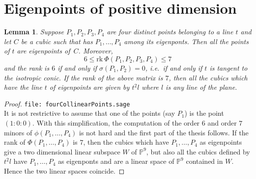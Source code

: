 \documentclass[11pt, a4paper, reqno, captions=tableheading,bibliography=totoc]{scrartcl}
\theoremstyle{plain}
\newtheorem{lemma}{Lemma}[section]
\theoremstyle{definition}
\newcommand{\rk}{\ensuremath{\mathrm{rk}}}
\begin{document}
\section{Eigenpoints of positive dimension}


\begin{lemma}
\label{4ptiSuRetta2}
Suppose $P_1, P_2, P_3, P_4$ are four distinct points belonging to a line $t$
and let
$C$ be a cubic such that has $P_1, \dots, P_4$ among its eigenponts. Then
all the points of $t$ are eigenpoints of~$C$. Moreover,
\begin{equation*}
6 \leq \rk  \  \Phi(P_1, P_2, P_3, P_4) \leq 7
\end{equation*}
and the rank is $6$ if and only if $\sigma(P_1, P_2) = 0$, i.e.\ if
and only if $t$ is tangent to the isotropic conic. If the rank of
the above matrix is $7$, then all the cubics which have the line $t$
of eigenpoints are given by $t^2l$ where $l$ is any line of the plane. 
\end{lemma}
\begin{proof}
\verb+file: fourCollinearPoints.sage+\\
It is not restrictive to assume that one of the points (say $P_1$) is
the point $(1: 0: 0)$. 
With this simplification, the computation of the order $6$ and order $7$
minors of $\phi(P_1, \dots, P_4)$ is not hard and 
the first part of the thesis follows. If the rank of $\Phi(P_1, \dots, P_4)$
is $7$, then the cubics which have $P_1, \dots, P_4$ as eigenpoints
give a two dimensional linear subspace $W$ of $\mathbb{P}^9$, but also all
the cubics defined by $t^2l$ have $P_1, \dots, P_4$ as eigenponts and are
a linear space of $\mathbb{P}^9$ contained in $W$. Hence the two linear
spaces coincide.
\end{proof}
\end{document}
